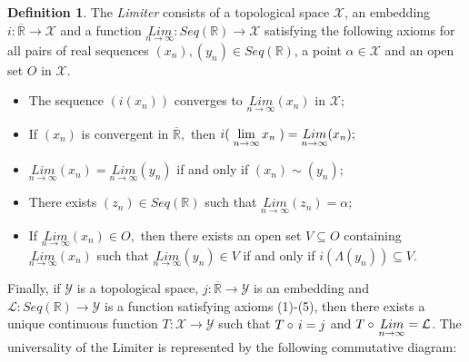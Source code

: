 \documentclass{amsart}
\theoremstyle{definition}
\newtheorem{definition}{Definition}
\theoremstyle{plain}
\begin{document}
\begin{definition}

The \emph{Limiter} consists of a topological space $\mathcal X$, an embedding $i: \overline{\mathbb{R}} \to \mathcal X$
and a function $\displaystyle \underset{n\to \infty}{Lim}: Seq(\mathbb{R}) \to \mathcal X$ satisfying the following axioms for all pairs of real  
sequences $(x_n),(y_n) \in Seq(\mathbb{R})$, a point $\alpha \in \mathcal X$ and an open set $O$ in $\mathcal X$.
\begin{itemize}
    \item[(1)] The sequence $(i(x_n))$ converges to $\underset{n\to \infty}{Lim}(x_n)$ in $\mathcal X;$
    \item[(2)] If $(x_n)$ is convergent in $\overline{\mathbb{R}},$ then $ \displaystyle i( \hspace{1mm} \lim_{n\to\infty} x_n \hspace{1mm}) = \underset{n\to \infty}{Lim}(x_n);$
    \item[(3)] $\underset{n\to \infty}{Lim}(x_n) = \underset{n\to \infty}{Lim}(y_n)$ if and only if $(x_n) \sim (y_n);$
    \item[(4)] There exists $(z_n) \in Seq(\mathbb{R})$ such that $\underset{n\to \infty}{Lim}(z_n)= \alpha;$
    \item[(5)] If $\underset{n\to \infty}{Lim}(x_n) \in O,$ then there exists an open set $V \subseteq O$ containing $\underset{n\to \infty}{Lim}(x_n)$ 
     such that $\underset{n\to \infty}{Lim}(y_n) \in V$ if and only if $i(\Lambda (y_n)) \subseteq V .$ 
\end{itemize}

Finally, if $\mathcal Y$ is a topological space, $j: \overline{\mathbb{R}} \to \mathcal Y$ is an embedding and $\mathcal{L}: Seq(\mathbb{R}) \to \mathcal Y $ is a
function satisfying axioms (1)-(5), then there exists a unique continuous function 
$T: \mathcal X \to \mathcal Y$ such that $T \circ \hspace{0.5mm} i = j$ and $T \circ \hspace{0.5mm} \underset{n\to \infty}{Lim} = \mathcal{L}$. The
universality of the Limiter is represented by the following commutative diagram:

\begin{center}
\end{center}

\end{definition}
\end{document}
